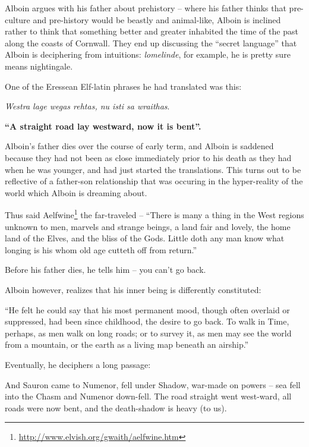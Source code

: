 Alboin argues with his father about prehistory -- where his father thinks that pre-culture and pre-history would be beastly and animal-like, Alboin is inclined rather to think that something better and greater inhabited the time of the past along the coasts of Cornwall. They end up discussing the ``secret language'' that Alboin is deciphering from intuitions: \emph{lomelinde}, for example, he is pretty sure means nightingale.

One of the Eressean Elf-latin phrases he had translated was this:

\emph{Westra lage wegas rehtas, nu isti sa wraithas}.


\textbf{``A straight road lay westward, now it is bent''.}


Alboin's father dies over the course of early term, and Alboin is saddened because they had not been as close immediately prior to his death as they had when he was younger, and had just started the translations. This turns out to be reflective of a father-son relationship that was occuring in the hyper-reality of the world which Alboin is dreaming about.

\begin{quotex}
Thus said Aelfwine\footnote{\url{http://www.elvish.org/gwaith/aelfwine.htm}} the far-traveled -- ``There is many a thing in the West regions unknown to men, marvels and strange beings, a land fair and lovely, the home land of the Elves, and the bliss of the Gods. Little doth any man know what longing is his whom old age cutteth off from return.''
\end{quotex}


Before his father dies, he tells him -- you can't go back.

Alboin however, realizes that his inner being is differently constituted:

\begin{quotex}
``He felt he could say that his most permanent mood, though often overlaid or suppressed, had been since childhood, the desire to go back. To walk in Time, perhaps, as men walk on long roads; or to survey it, as men may see the world from a mountain, or the earth as a living map beneath an airship.''
\end{quotex}


Eventually, he deciphers a long passage:

\begin{quotex}
And Sauron came to Numenor, fell under Shadow, war-made on powers -- sea fell into the Chasm and Numenor down-fell. The road straight went west-ward, all roads were now bent, and the death-shadow is heavy (to us).
\end{quotex}


